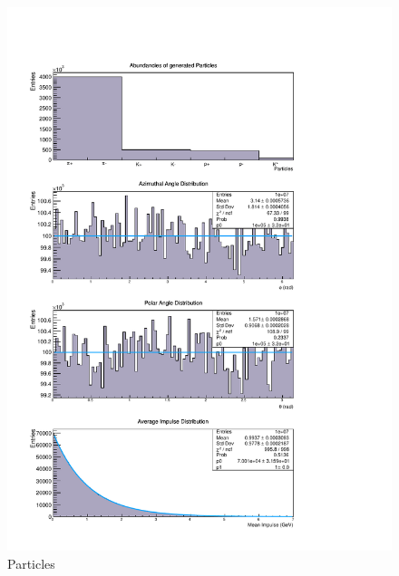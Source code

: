 \documentclass{article}
\begin{document}
\begin{figure}[ht]
    \centering
    \includegraphics[height = 1.05\textheight]{ParticlesHistos.pdf}
    \caption{Particles}
    \label{fig:Particles}
\end{figure}
\end{document}
